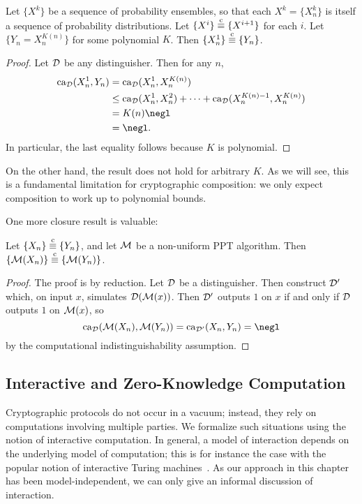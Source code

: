 \begin{prop}
  Let $\{X^k\}$ be a sequence of probability ensembles, so
  that each $X^k = \{X^k_n\}$ is itself a sequence of probability distributions.
  Let $\{X^i\}\overset{\text{c}}{\equiv}\{X^{i+1}\}$ for each $i$. Let $\{Y_n = X^{K(n)}_n\}$ for
  some polynomial $K$. Then $\{X^1_n\}\overset{\text{c}}{\equiv}\{Y_n\}$.
\end{prop}

\begin{proof}
  Let $\mathcal{D}$ be any distinguisher. Then for any $n$, \begin{align*}
    \ca_\cD(X^1_n, Y_n) &= \ca_\cD(X^1_n, X^{K(n)}_n) \\
                          &\leq \ca_\cD(X^1_n, X^2_n) + \cdots + \ca_\cD(X^{K(n) - 1}_n, X^{K(n)}_n) \\
                          &= K(n)\negl \\
                          &= \negl.
   \end{align*}
   In particular, the last equality follows because $K$ is polynomial.
\end{proof}

On the other hand, the result does not hold for arbitrary $K$. As we will see,
this is a fundamental limitation for cryptographic composition: we only expect
composition to work up to polynomial bounds.

One more closure result is valuable:

\begin{prop}
  Let $\{X_n\}\overset{\text{c}}{\equiv}\{Y_n\}$, and let $\mathcal{M}$ be a non-uniform PPT algorithm. Then
  $\{\mathcal{M}(X_n)\} \overset{\text{c}}{\equiv} \{\mathcal{M}(Y_n)\}$.
\end{prop}

\begin{proof}
  The proof is by reduction. Let $\mathcal{D}$ be a distinguisher. Then construct $\mathcal{D}'$
  which, on input $x$, simulates $\mathcal{D}(\mathcal{M}(x))$. Then $\mathcal{D}'$ outputs $1$ on $x$ if and
  only if $\mathcal{D}$ outputs $1$ on $\mathcal{M}(x)$, so \[
    \ca_\cD(\cM(X_n), \cM(Y_n)) = \ca_{\cD'}(X_n, Y_n) = \negl
  \] by the computational indistinguishability assumption.
\end{proof}

\subsection{Interactive and Zero-Knowledge Computation}
\label{sec:interactive computation}
\label{sec:zero-knowledge}

Cryptographic protocols do not occur in a vacuum; instead, they rely on
computations involving multiple parties. We formalize such situations using the
notion of interactive computation. In general, a model of interaction depends on
the underlying model of computation; this is for instance the case with the
popular notion of interactive Turing machines~\cite[Definition
4.2.1]{goldreich-2001}. As our approach in this chapter has been
model-independent, we can only give an informal discussion of interaction.

